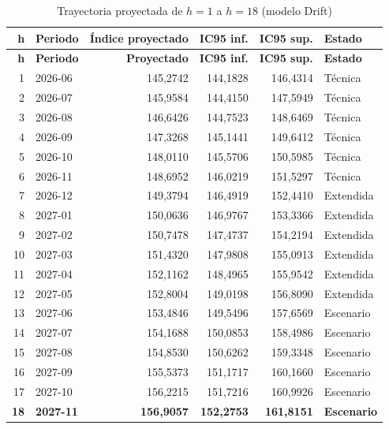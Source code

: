 \documentclass[11pt,letterpaper]{article}
\begin{document}
\begin{longtable}{@{}rlrrrl@{}}
\caption{Trayectoria proyectada de \(h=1\) a \(h=18\) (modelo Drift)}\\
\toprule
\textbf{h} & \textbf{Periodo} & \textbf{Índice proyectado} & \textbf{IC95 inf.} & \textbf{IC95 sup.} & \textbf{Estado} \\
\midrule
\endfirsthead
\toprule
\textbf{h} & \textbf{Periodo} & \textbf{Proyectado} & \textbf{IC95 inf.} & \textbf{IC95 sup.} & \textbf{Estado} \\
\midrule
\endhead
1 & 2026-06 & 145{,}2742 & 144{,}1828 & 146{,}4314 & Técnica \\
2 & 2026-07 & 145{,}9584 & 144{,}4150 & 147{,}5949 & Técnica \\
3 & 2026-08 & 146{,}6426 & 144{,}7523 & 148{,}6469 & Técnica \\
4 & 2026-09 & 147{,}3268 & 145{,}1441 & 149{,}6412 & Técnica \\
5 & 2026-10 & 148{,}0110 & 145{,}5706 & 150{,}5985 & Técnica \\
6 & 2026-11 & 148{,}6952 & 146{,}0219 & 151{,}5297 & Técnica \\
7 & 2026-12 & 149{,}3794 & 146{,}4919 & 152{,}4410 & Extendida \\
8 & 2027-01 & 150{,}0636 & 146{,}9767 & 153{,}3366 & Extendida \\
9 & 2027-02 & 150{,}7478 & 147{,}4737 & 154{,}2194 & Extendida \\
10 & 2027-03 & 151{,}4320 & 147{,}9808 & 155{,}0913 & Extendida \\
11 & 2027-04 & 152{,}1162 & 148{,}4965 & 155{,}9542 & Extendida \\
12 & 2027-05 & 152{,}8004 & 149{,}0198 & 156{,}8090 & Extendida \\
13 & 2027-06 & 153{,}4846 & 149{,}5496 & 157{,}6569 & Escenario \\
14 & 2027-07 & 154{,}1688 & 150{,}0853 & 158{,}4986 & Escenario \\
15 & 2027-08 & 154{,}8530 & 150{,}6262 & 159{,}3348 & Escenario \\
16 & 2027-09 & 155{,}5373 & 151{,}1717 & 160{,}1660 & Escenario \\
17 & 2027-10 & 156{,}2215 & 151{,}7216 & 160{,}9926 & Escenario \\
\textbf{18} & \textbf{2027-11} & \textbf{156{,}9057} & \textbf{152{,}2753} & \textbf{161{,}8151} & \textbf{Escenario} \\
\bottomrule
\end{longtable}
\end{document}
